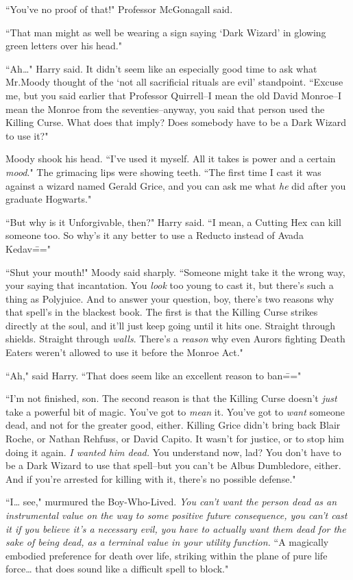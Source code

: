 ``You've no proof of that!" Professor McGonagall said.

``That man might as well be wearing a sign saying `Dark Wizard' in glowing green letters over his head."

``Ah{\ldots}" Harry said. It didn't seem like an especially good time to ask what Mr.\?Moody thought of the `not all sacrificial rituals are evil' standpoint. ``Excuse me, but you said earlier that Professor Quirrell\---I mean the old David Monroe\---I mean the Monroe from the seventies\---anyway, you said that person used the Killing Curse. What does that imply? Does somebody have to be a Dark Wizard to use it?"

Moody shook his head. ``I've used it myself. All it takes is power and a certain \emph{mood}." The grimacing lips were showing teeth. ``The first time I cast it was against a wizard named Gerald Grice, and you can ask me what \emph{he} did after you graduate Hogwarts."

``But why is it Unforgivable, then?" Harry said. ``I mean, a Cutting Hex can kill someone too. So why's it any better to use a Reducto instead of Avada Kedav\==="

``Shut your mouth!" Moody said sharply. ``Someone might take it the wrong way, your saying that incantation. You \emph{look} too young to cast it, but there's such a thing as Polyjuice. And to answer your question, boy, there's two reasons why that spell's in the blackest book. The first is that the Killing Curse strikes directly at the soul, and it'll just keep going until it hits one. Straight through shields. Straight through \emph{walls}. There's a \emph{reason} why even Aurors fighting Death Eaters weren't allowed to use it before the Monroe Act."

``Ah," said Harry. ``That does seem like an excellent reason to ban\==="

``I'm not finished, son. The second reason is that the Killing Curse doesn't \emph{just} take a powerful bit of magic. You've got to \emph{mean} it. You've got to \emph{want} someone dead, and not for the greater good, either. Killing Grice didn't bring back Blair Roche, or Nathan Rehfuss, or David Capito. It wasn't for justice, or to stop him doing it again. \emph{I wanted him dead.} You understand now, lad? You don't have to be a Dark Wizard to use that spell\---but you can't be Albus Dumbledore, either. And if you're arrested for killing with it, there's no possible defense."

``I{\ldots} see," murmured the Boy-Who-Lived. \emph{You can't want the person dead as an instrumental value on the way to some positive future consequence, you can't cast it if you believe it's a necessary evil, you have to actually want them dead for the sake of being dead, as a terminal value in your utility function.} ``A magically embodied preference for death over life, striking within the plane of pure life force{\ldots} that does sound like a difficult spell to block."

